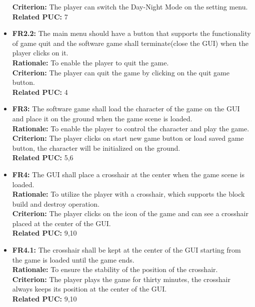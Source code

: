 \documentclass[12pt, titlepage]{article}
\begin{document}
\begin{itemize}
        \textbf{Criterion:} The player can switch the Day-Night Mode on the setting menu.\\
        \textbf{Related PUC:} 7
        \item \textbf{FR2.2:} The main menu should have a button that supports the functionality of game quit and the software game shall terminate(close the GUI) when the player clicks on it.\\
        \textbf{Rationale:} To enable the player to quit the game.\\
        \textbf{Criterion:} The player can quit the game by clicking on the quit game button.\\
        \textbf{Related PUC:} 4
        
        \item \textbf{FR3:} The software game shall load the character of the game on the GUI and place it on the ground when the game scene is loaded.\\
        \textbf{Rationale:} To enable the player to control the character and play the game.\\
        \textbf{Criterion:} The player clicks on start new game button or load saved game button, the character will be initialized on the ground.\\
        \textbf{Related PUC:} 5,6
        
        \item \textbf{FR4:} The GUI shall place a crosshair at the center when the game scene is loaded.\\
        \textbf{Rationale:} To utilize the player with a crosshair, which supports the block build and destroy operation.\\
        \textbf{Criterion:} The player clicks on the icon of the game and can see a crosshair placed at the center of the GUI.\\
        \textbf{Related PUC:} 9,10
        
        \item \textbf{FR4.1:} The crosshair shall be kept at the center of the GUI starting from the game is loaded until the game ends.\\
        \textbf{Rationale:} To ensure the stability of the position of the crosshair.\\
        \textbf{Criterion:} The player plays the game for thirty minutes, the crosshair always keeps its position at the center of the GUI.\\
        \textbf{Related PUC:} 9,10
        

\end{itemize}
\end{document}
